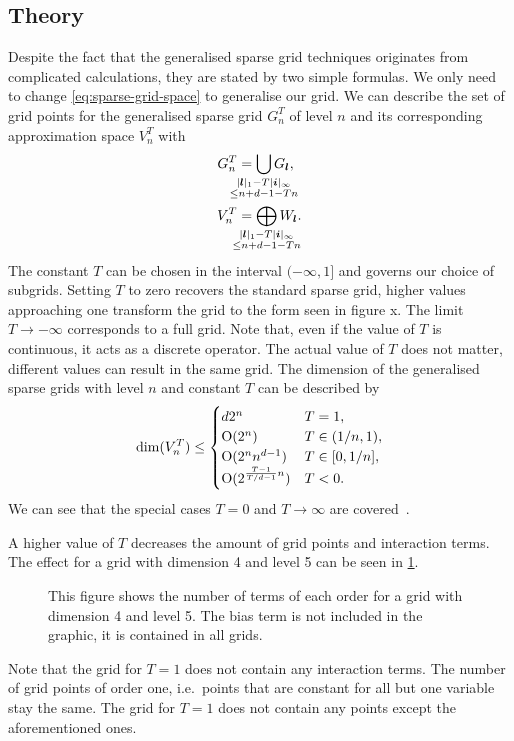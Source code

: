 \subsection{Theory}
Despite the fact that the generalised sparse grid techniques originates from
complicated calculations, they are stated by two simple formulas.
We only need to change \vref{eq:sparse-grid-space} to generalise our grid.
We can describe the set of grid points for the generalised sparse grid \(G^T_n\)
of level \(n\) and its corresponding approximation space \(V^T_n\) with
\begin{align}\label{eq:generalised-grid-space}
G_n^T &= \bigcup_{\mathclap{\substack{\vert {\bm{l}} \vert_1 - T \vert \bm{i} \vert_\infty \\ \leq n + d - 1 - T n}}} G_{\bm{l}},\\
V_n^T &= \bigoplus_{\mathclap{\substack{\vert {\bm{l}} \vert_1 - T \vert \bm{i} \vert_\infty \\ \leq n + d - 1 - T n}}} W_{\bm{l}}.\nonumber
\end{align}
The constant \(T\) can be chosen in the interval \((-\infty, 1]\) and governs
our choice of subgrids.
Setting \(T\) to zero recovers the standard sparse grid, higher values
approaching one transform the grid to the form seen in figure x.
The limit \(T \to -\infty\) corresponds to a full grid.
Note that, even if the value of \(T\) is continuous, it acts as a discrete
operator.
The actual value of \(T\) does not matter, different values can result in the
same grid.
The dimension of the generalised sparse grids with level \(n\) and constant
\(T\) can be described by
\begin{equation*}
  \operatorname{dim}(V^T_n) \leq
  \begin{cases}
    d 2^n & T = 1, \\
    \operatorname{O}(2^n) & T \in (1/n, 1),\\
    \operatorname{O}(2^n n^{d-1}) & T \in [0, 1/n],\\
    \operatorname{O}(2^{\frac{T - 1}{T/d - 1} n}) & T < 0.
  \end{cases}
\end{equation*}
We can see that the special cases \(T = 0\) and \(T \to \infty\) are covered~\cite{optimizedApproxSpaces}.

A higher value of \(T\) decreases the amount of grid points and interaction terms.
The effect for a grid with dimension 4 and level 5 can be seen in \cref{fig:adaptivity}.
\begin{figure}[thb]
%
\caption[Order of interaction terms for generalised sparse grids.]{
This figure shows the number of terms of each order for a grid with dimension 4
and level 5.
The bias term is not included in the graphic, it is contained in all grids.}\label{fig:adaptivity}
\end{figure}
Note that the grid for \(T = 1\) does not contain any interaction terms.
The number of grid points of order one, i.e.~points that are constant for all
but one variable stay the same.
The grid for \(T = 1\) does not contain any points except the aforementioned
ones.

